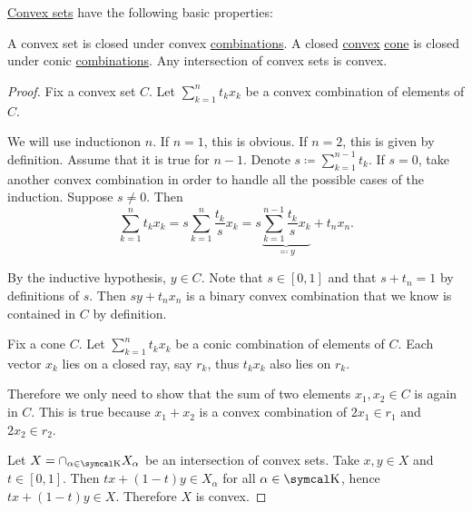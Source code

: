 \begin{proposition}\label{thm:convex_set_properties}
  \hyperref[def:convex_set]{Convex sets} have the following basic properties:

  \begin{PropEnum}
     A convex set is closed under convex \hyperref[def:linear_combination/convex]{combinations}.
     A closed \hyperref[def:convex_set]{convex} \hyperref[def:geometric_cone]{cone} is closed under conic \hyperref[def:linear_combination/conic]{combinations}.
     Any intersection of convex sets is convex.
  \end{PropEnum}
\end{proposition}
\begin{proof}
   Fix a convex set \( C \). Let \( \sum_{k=1}^n t_k x_k \) be a convex combination of elements of \( C \).

  We will use induction\IND on \( n \). If \( n = 1 \), this is obvious. If \( n = 2 \), this is given by definition. Assume that it is true for \( n - 1 \). Denote \( s \coloneqq \sum_{k=1}^{n-1} t_k \). If \( s = 0 \), take another convex combination in order to handle all the possible cases of the induction\IND. Suppose \( s \neq 0 \). Then
  \begin{equation*}
    \sum_{k=1}^n t_k x_k
    =
    s \sum_{k=1}^n \frac {t_k} s x_k
    =
    s \underbrace{\sum_{k=1}^{n-1} \frac {t_k} s x_k}_{\eqqcolon y} + t_n x_n.
  \end{equation*}

  By the inductive hypothesis, \( y \in C \). Note that \( s \in [0, 1] \) and that \( s + t_n = 1 \) by definitions of \( s \). Then \( s y + t_n x_n \) is a binary convex combination that we know is contained in \( C \) by definition.

   Fix a cone \( C \). Let \( \sum_{k=1}^n t_k x_k \) be a conic combination of elements of \( C \). Each vector \( x_k \) lies on a closed ray, say \( r_k \), thus \( t_k x_k \) also lies on \( r_k \).

  Therefore we only need to show that the sum of two elements \( x_1, x_2 \in C \) is again in \( C \). This is true because \( x_1 + x_2 \) is a convex combination of \( 2x_1 \in r_1 \) and \( 2x_2 \in r_2 \).

   Let \( X = \cap_{\alpha \in \CK} X_\alpha \) be an intersection of convex sets. Take \( x, y \in X \) and \( t \in [0, 1] \). Then \( tx + (1-t)y \in X_\alpha \) for all \( \alpha \in \CK \), hence \( tx + (1-t)y \in X \). Therefore \( X \) is convex.
\end{proof}

